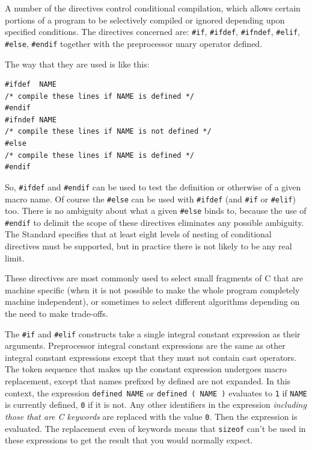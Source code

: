    A number of the directives control conditional compilation, which
    allows certain portions of a program to be selectively compiled or
    ignored depending upon specified conditions. The directives concerned
    are: \texttt{\#if}, \texttt{\#ifdef}, \texttt{\#ifndef},
    \texttt{\#elif}, \texttt{\#else}, \texttt{\#endif} together
    with the preprocessor unary operator defined.


   The way that they are used is like this:


   \begin{Verbatim}
#ifdef  NAME
/* compile these lines if NAME is defined */
#endif
#ifndef NAME
/* compile these lines if NAME is not defined */
#else
/* compile these lines if NAME is defined */
#endif
\end{Verbatim}

   So, \texttt{\#ifdef} and \texttt{\#endif} can be used to test
    the definition or otherwise of a given macro name. Of course the
    \texttt{\#else} can be used with \texttt{\#ifdef} (and
    \texttt{\#if} or \texttt{\#elif}) too. There is no ambiguity about
    what a given \texttt{\#else} binds to, because the use of
    \texttt{\#endif} to delimit the scope of these directives eliminates
    any possible ambiguity. The Standard specifies that at least eight
    levels of nesting of conditional directives must be supported, but in
    practice there is not likely to be any real limit.


   These directives are most commonly used to select small fragments of
    C that are machine specific (when it is not possible to make the whole
    program completely machine independent), or sometimes to select
    different algorithms depending on the need to make trade-offs.


   The \texttt{\#if} and \texttt{\#elif} constructs take a single
    integral constant expression as their arguments. Preprocessor integral
    constant expressions are the same as other integral constant expressions
    except that they must not contain cast operators. The token sequence
    that makes up the constant expression undergoes macro replacement,
    except that names prefixed by defined are not expanded. In this context,
    the expression \texttt{defined NAME} or \texttt{defined ( NAME
    )} evaluates to \texttt{1} if \texttt{NAME} is currently
    defined, \texttt{0} if it is not. Any other identifiers in the
    expression \textit{including those that are C keywords} are replaced
    with the value \texttt{0}. Then the expression is evaluated. The
    replacement even of keywords means that \texttt{sizeof} can't be
    used in these expressions to get the result that you would normally
    expect.


